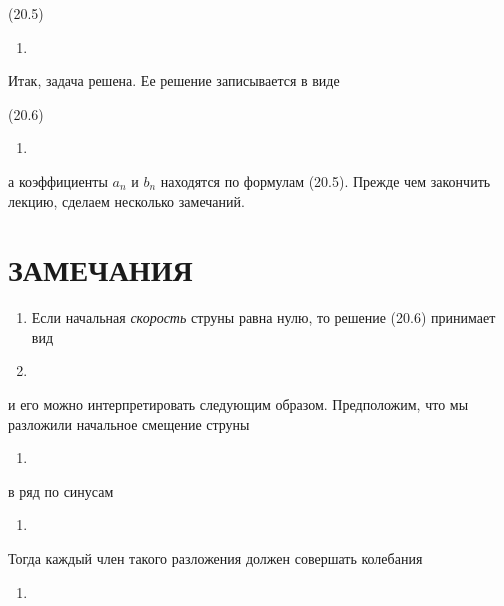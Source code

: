\documentclass[
  ukrainian,
]{article}
\providecommand{\tightlist}{%
  \setlength{\itemsep}{0pt}\setlength{\parskip}{0pt}}
\begin{document}
(20.5)

\begin{enumerate}
\def\labelenumi{\arabic{enumi}.}
\setcounter{enumi}{11}
\tightlist
\item
\end{enumerate}

Итак, задача решена. Ее решение записывается в виде

(20.6)

\begin{enumerate}
\def\labelenumi{\arabic{enumi}.}
\setcounter{enumi}{12}
\tightlist
\item
\end{enumerate}

а коэффициенты \(a_n\) и \(b_n\) находятся по формулам (20.5). Прежде
чем закончить лекцию, сделаем несколько замечаний.

\section{ЗАМЕЧАНИЯ}\label{ux437ux430ux43cux435ux447ux430ux43dux438ux44f-7}

\begin{enumerate}
\def\labelenumi{\arabic{enumi}.}
\item
  Если начальная \emph{скорость} струны равна нулю, то решение (20.6)
  принимает вид
\item
\end{enumerate}

и его можно интерпретировать следующим образом. Предположим, что мы
разложили начальное смещение струны

\begin{enumerate}
\def\labelenumi{\arabic{enumi}.}
\setcounter{enumi}{14}
\tightlist
\item
\end{enumerate}

в ряд по синусам

\begin{enumerate}
\def\labelenumi{\arabic{enumi}.}
\setcounter{enumi}{15}
\tightlist
\item
\end{enumerate}

Тогда каждый член такого разложения должен совершать колебания

\begin{enumerate}
\def\labelenumi{\arabic{enumi}.}
\setcounter{enumi}{16}
\tightlist
\item
\end{enumerate}
\end{document}
